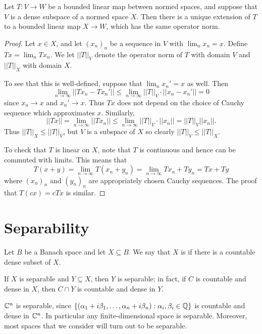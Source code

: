 \begin{lemma}
\label{linear extension}
Let $T: V \to W$ be a bounded linear map between normed spaces, and suppose that $V$ is a dense subspace of a normed space $X$.
Then there is a unique extension of $T$ to a bounded linear map $X \to W$, which has the same operator norm.
\end{lemma}
\begin{proof}
Let $x \in X$, and let $(x_n)_n$ be a sequence in $V$ with $\lim_n x_n = x$.
Define $Tx = \lim_n Tx_n$.
We let $||T||_V$ denote the operator norm of $T$ with domain $V$ and $||T||_X$ with domain $X$.

To see that this is well-defined, suppose that $\lim_n x_n' = x$ as well. Then
$$\lim_{n \to \infty} ||Tx_n - Tx_n'|| \leq \lim_{n \to \infty} ||T||_V \cdot||x_n - x_n'|| = 0$$
since $x_n \to x$ and $x_n' \to x$.
Thus $Tx$ does not depend on the choice of Cauchy sequence which approximates $x$.
Similarly,
$$||Tx|| = \lim_{n \to \infty} ||Tx_n|| \leq \lim_{n \to \infty} ||T||_V \cdot||x_n|| = ||T||_V ||x_n||.$$
Thus $||T||_X \leq ||T||_V$, but $V$ is a subspace of $X$ so clearly $||T||_V \leq ||T||_X$.

To check that $T$ is linear on $X$, note that $T$ is continuous and hence can be commuted with limits. This means that
$$T(x + y) = \lim_{n \to \infty} T(x_n + y_n) = \lim_{n \to \infty} Tx_n + Ty_n = Tx + Ty$$
where $(x_n)_n$ and $(y_n)_n$ are appropriately chosen Cauchy sequences.
The proof that $T(cx) = cTx$ is similar.
\end{proof}

\section{Separability}
\begin{definition}
Let $B$ be a Banach space and let $X \subseteq B$. We say that $X$ is  if there is a countable dense subset of $X$.
\end{definition}

\begin{subsec}
If $X$ is separable and $Y \subseteq X$, then $Y$ is separable; in fact, if $C$ is countable and dense in $X$, then $C \cap Y$ is countable and dense in $Y$.
\end{subsec}

\begin{example}
$\mathbb{C}^n$ is separable, since $\{(\alpha_1 + i\beta_1, \dots, \alpha_n + i \beta_n): \alpha_i, \beta_i \in \mathbb{Q}\}$ is countable and dense in $\mathbb{C}^n$.
In particular any finite-dimensional space is separable. Moreover, most spaces that we consider will turn out to be separable.
\end{example}

